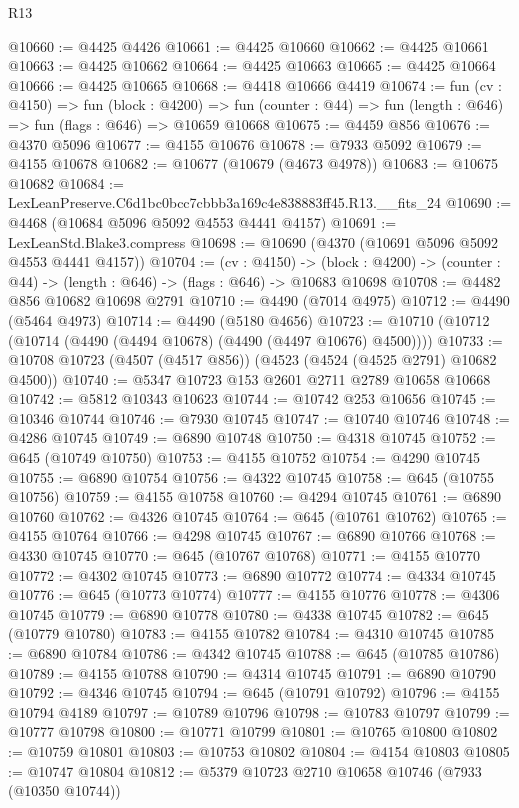 \begin{lexlean}{R13}
\begin{coremodule}
@10660 := @4425 @4426
@10661 := @4425 @10660
@10662 := @4425 @10661
@10663 := @4425 @10662
@10664 := @4425 @10663
@10665 := @4425 @10664
@10666 := @4425 @10665
@10668 := @4418 @10666 @4419
@10674 := fun (cv : @4150) =>
  fun (block : @4200) =>
  fun (counter : @44) => fun (length : @646) => fun (flags : @646) => @10659 @10668
@10675 := @4459 @856
@10676 := @4370 @5096
@10677 := @4155 @10676
@10678 := @7933 @5092
@10679 := @4155 @10678
@10682 := @10677 (@10679 (@4673 @4978))
@10683 := @10675 @10682
@10684 := LexLeanPreserve.C6d1bc0bcc7cbbb3a169c4e838883ff45.R13.__fits_24
@10690 := @4468 (@10684 @5096 @5092 @4553 @4441 @4157)
@10691 := LexLeanStd.Blake3.compress
@10698 := @10690 (@4370 (@10691 @5096 @5092 @4553 @4441 @4157))
@10704 := (cv : @4150) ->
  (block : @4200) -> (counter : @44) -> (length : @646) -> (flags : @646) -> @10683 @10698
@10708 := @4482 @856 @10682 @10698 @2791
@10710 := @4490 (@7014 @4975)
@10712 := @4490 (@5464 @4973)
@10714 := @4490 (@5180 @4656)
@10723 := @10710 (@10712 (@10714 (@4490 (@4494 @10678) (@4490 (@4497 @10676) @4500))))
@10733 := @10708 @10723 (@4507 (@4517 @856)) (@4523 (@4524 (@4525 @2791) @10682 @4500))
@10740 := @5347 @10723 @153 @2601 @2711 @2789 @10658 @10668
@10742 := @5812 @10343 @10623
@10744 := @10742 @253 @10656
@10745 := @10346 @10744
@10746 := @7930 @10745
@10747 := @10740 @10746
@10748 := @4286 @10745
@10749 := @6890 @10748
@10750 := @4318 @10745
@10752 := @645 (@10749 @10750)
@10753 := @4155 @10752
@10754 := @4290 @10745
@10755 := @6890 @10754
@10756 := @4322 @10745
@10758 := @645 (@10755 @10756)
@10759 := @4155 @10758
@10760 := @4294 @10745
@10761 := @6890 @10760
@10762 := @4326 @10745
@10764 := @645 (@10761 @10762)
@10765 := @4155 @10764
@10766 := @4298 @10745
@10767 := @6890 @10766
@10768 := @4330 @10745
@10770 := @645 (@10767 @10768)
@10771 := @4155 @10770
@10772 := @4302 @10745
@10773 := @6890 @10772
@10774 := @4334 @10745
@10776 := @645 (@10773 @10774)
@10777 := @4155 @10776
@10778 := @4306 @10745
@10779 := @6890 @10778
@10780 := @4338 @10745
@10782 := @645 (@10779 @10780)
@10783 := @4155 @10782
@10784 := @4310 @10745
@10785 := @6890 @10784
@10786 := @4342 @10745
@10788 := @645 (@10785 @10786)
@10789 := @4155 @10788
@10790 := @4314 @10745
@10791 := @6890 @10790
@10792 := @4346 @10745
@10794 := @645 (@10791 @10792)
@10796 := @4155 @10794 @4189
@10797 := @10789 @10796
@10798 := @10783 @10797
@10799 := @10777 @10798
@10800 := @10771 @10799
@10801 := @10765 @10800
@10802 := @10759 @10801
@10803 := @10753 @10802
@10804 := @4154 @10803
@10805 := @10747 @10804
@10812 := @5379 @10723 @2710 @10658 @10746 (@7933 (@10350 @10744))

\end{coremodule}
\end{lexlean}
